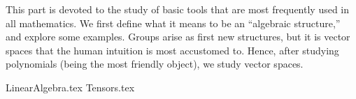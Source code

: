 \label{part:basicalgebra}

This part is devoted to the study of basic tools
that are most frequently used in all mathematics.
We first define what it means to be an ``algebraic structure,''
and explore some examples.
Groups arise as first new structures,
but it is vector spaces that the human intuition is most accustomed to.
Hence, after studying polynomials (being the most friendly object),
we study vector spaces.

{LinearAlgebra.tex}
{Tensors.tex}